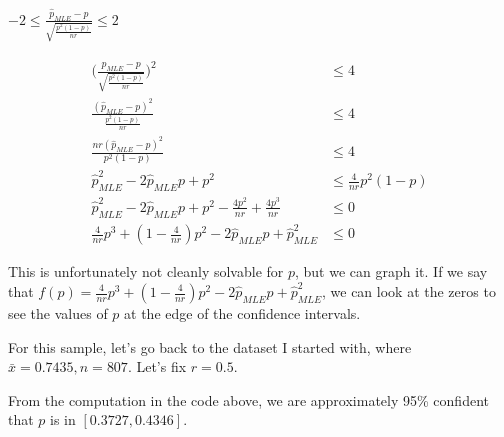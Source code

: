 \documentclass[
  letterpaper,
  DIV=11,
  numbers=noendperiod]{scrreprt}
\newenvironment{Shaded}{\begin{snugshade}}{\end{snugshade}}
\newcommand{\NormalTok}[1]{\textcolor[rgb]{0.00,0.23,0.31}{#1}}
\begin{document}
\(-2 \leq \frac{\hat{p}_{MLE} - p}{\sqrt{ \frac{p^2(1-p)}{nr}}} \leq 2\)

\[
\begin{aligned}
\Bigg( \frac{\hat{p}_{MLE} - p}{\sqrt{ \frac{p^2(1-p)}{nr}}} \Bigg)^2 &\leq 4 \\
\frac{(\hat{p}_{MLE} - p)^2}{ \frac{p^2(1-p)}{nr}} &\leq 4 \\
\frac{nr(\hat{p}_{MLE} - p)^2}{p^2(1-p)} &\leq 4 \\
\hat{p}_{MLE}^2 -2\hat{p}_{MLE}p + p^2 &\leq \frac{4}{nr}p^2(1-p) \\
\hat{p}_{MLE}^2 -2\hat{p}_{MLE}p + p^2- \frac{4p^2}{nr} + \frac{4p^3}{nr} &\leq 0 \\
\frac{4}{nr}p^3 + (1- \frac{4}{nr})p^2 - 2\hat{p}_{MLE}p + \hat{p}_{MLE}^2 &\leq 0 
\end{aligned}
\]

This is unfortunately not cleanly solvable for \(p\), but we can graph
it. If we say that
\(f(p) = \frac{4}{nr}p^3 + (1- \frac{4}{nr})p^2 - 2\hat{p}_{MLE}p + \hat{p}_{MLE}^2\),
we can look at the zeros to see the values of \(p\) at the edge of the
confidence intervals.

For this sample, let's go back to the dataset I started with, where
\(\bar{x} = 0.7435, n=807\). Let's fix \(r = 0.5\).

\begin{Shaded}
\end{Shaded}

From the computation in the code above, we are approximately 95\%
confident that \(p\) is in \([0.3727, 0.4346].\)
\end{document}
